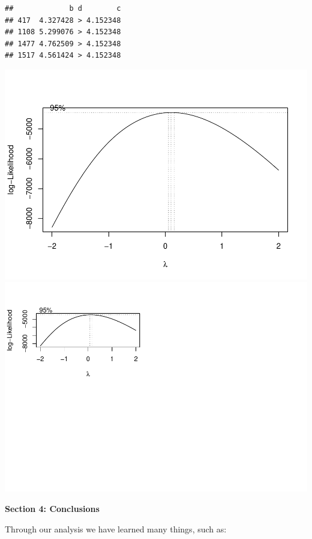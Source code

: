 \documentclass[
]{article}
\begin{document}
\begin{verbatim}
##             b d        c
## 417  4.327428 > 4.152348
## 1108 5.299076 > 4.152348
## 1477 4.762509 > 4.152348
## 1517 4.561424 > 4.152348
\end{verbatim}

\includegraphics{Final_Project_2_files/figure-latex/unnamed-chunk-18-1.pdf}
\includegraphics{Final_Project_2_files/figure-latex/unnamed-chunk-18-2.pdf}

\textbf{Section 4: Conclusions}

Through our analysis we have learned many things, such as:
\end{document}
